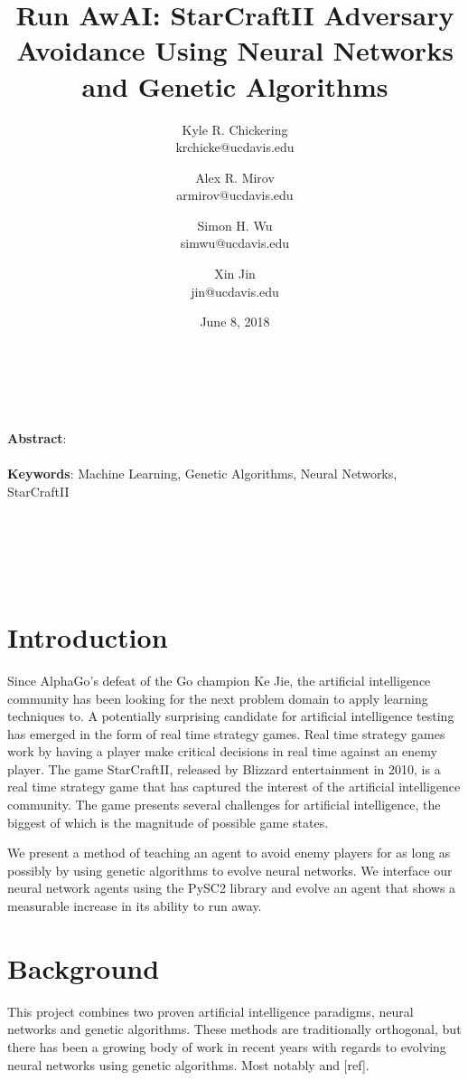 \documentclass{article}
\title{Run AwAI: StarCraftII Adversary Avoidance Using Neural Networks and
  Genetic Algorithms}
\author{Kyle R. Chickering \\ krchicke@ucdavis.edu
  \and Alex R. Mirov \\ armirov@ucdavis.edu
  \and Simon H. Wu \\ simwu@ucdavis.edu
  \and Xin Jin \\ jin@ucdavis.edu}
\date{June 8, 2018}
\renewenvironment{abstract}
{
\begin{changemargin}{0.5in}{0.5in}
}
{
\end{changemargin}
}
\begin{document}
\maketitle
\hline
\\~\\

\begin{abstract}
  \textbf{Abstract}: \blindtext
  \\~\\
  \textbf{Keywords}: Machine Learning, Genetic Algorithms, Neural Networks,
  StarCraftII
\end{abstract}
\\~\\
\hline
\\~\\

\begin{multicols}{2}
\section{Introduction}
Since AlphaGo's defeat of the Go champion Ke Jie, the artificial intelligence
community has
been looking for the next problem domain to apply learning techniques to. A
potentially surprising candidate for artificial intelligence testing has
emerged in the form of real time strategy games. Real time strategy games work
by having a player make critical decisions in real time against an enemy
player. The game StarCraftII, released by Blizzard entertainment in 2010, is a
real time strategy
game that has captured the interest of the artificial intelligence community.
The game presents several challenges for artificial intelligence, the biggest of
which is the magnitude of possible game states.

We present a method of teaching an agent to avoid enemy players for as long as
possibly by using genetic algorithms to evolve neural networks. We interface
our neural network agents using the PySC2 library  and evolve an agent that
shows a measurable increase in its ability to run away.

\section{Background}
This project combines two proven artificial intelligence paradigms, neural
networks and genetic algorithms. These methods are traditionally orthogonal,
but there has been a growing body of work in recent years with regards to
evolving neural networks using genetic algorithms. Most notably \cite{NEAT} and
[ref].


\end{multicols}
\end{document}
